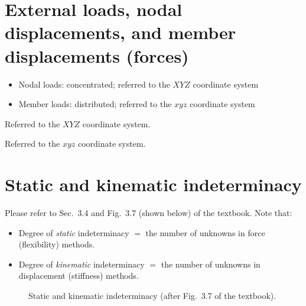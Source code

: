\section{External loads, nodal displacements, and member displacements (forces)}
\begin{itemize}
  \item Nodal loads: concentrated; referred to the $XYZ$ coordinate system
  \item Member loads: distributed; referred to the $xyz$ coordinate system
\end{itemize}

Referred to the $XYZ$ coordinate system.

Referred to the $xyz$ coordinate system.

\section{Static and kinematic indeterminacy}
Please refer to Sec.~3.4 and Fig.~3.7 (shown below) of the textbook. Note that:
\begin{itemize}
  \item Degree of \emph{static} indeterminacy $=$ the number of unknowns in force (flexibility) methods.
  \item Degree of \emph{kinematic} indeterminacy $=$ the number of unknowns in displacement (stiffness) methods.
\end{itemize}
\begin{figure}[H]
  \centering
  
  \caption{Static and kinematic indeterminacy (after Fig.~3.7 of the textbook).}
\end{figure}
